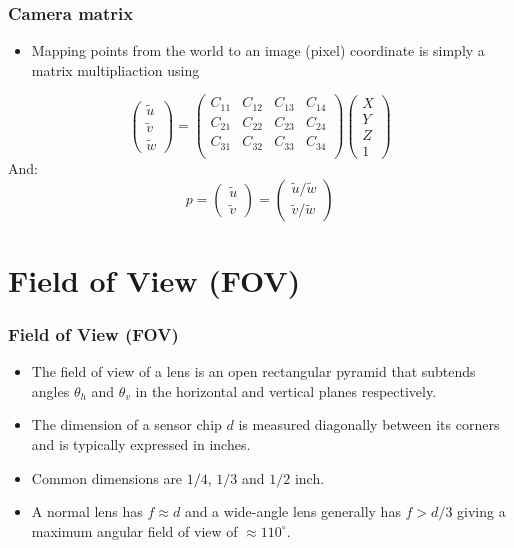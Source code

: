 \begin{frame}
\frametitle{Camera matrix}
\begin{itemize}
\item Mapping points from the world to an image (pixel) coordinate is simply a matrix multipliaction using
\end{itemize}
\[
\left (
\begin{array}{c}
\tilde{u} \\
\tilde{v} \\
\tilde{w}
\end{array}
\right )
=
\left (
\begin{array}{cccc}
C_{11} & C_{12} & C_{13} & C_{14} \\
C_{21} & C_{22} & C_{23} & C_{24} \\
C_{31} & C_{32} & C_{33} & C_{34} \\
\end{array}
\right )
\left (
\begin{array}{c}
X \\
Y \\
Z \\
1
\end{array}
\right )
\]
And:
\[
p =
\left (
\begin{array}{c}
\tilde{u} \\
\tilde{v}
\end{array}
\right )
=
\left (
\begin{array}{c}
\tilde{u}/\tilde{w} \\
\tilde{v}/\tilde{w}
\end{array}
\right )
\]
\end{frame}

\section{Field of View (FOV)}

\begin{frame}
\frametitle{Field of View (FOV)}
\begin{itemize}
\item The field of view of a lens is an open rectangular pyramid that subtends angles $\theta_h$ and $\theta_v$ in the horizontal and vertical planes respectively.
\item The dimension of a sensor chip $d$ is measured diagonally between its corners and is typically expressed in inches.
\item Common dimensions are $1/4$, $1/3$ and $1/2$ inch.
\item A normal lens has $f \approx d$ and a wide-angle lens generally has $f > d/3$ giving a maximum angular field of view of $\approx 110 ^{\circ}$.
\end{itemize}
\end{frame}

